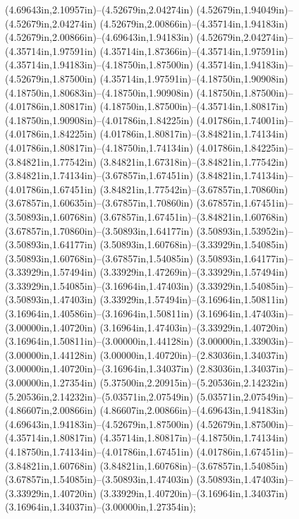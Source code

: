 (4.69643in,2.10957in)--(4.52679in,2.04274in) (4.52679in,1.94049in)--(4.52679in,2.04274in) (4.52679in,2.00866in)--(4.35714in,1.94183in) (4.52679in,2.00866in)--(4.69643in,1.94183in) (4.52679in,2.04274in)--(4.35714in,1.97591in) (4.35714in,1.87366in)--(4.35714in,1.97591in) (4.35714in,1.94183in)--(4.18750in,1.87500in) (4.35714in,1.94183in)--(4.52679in,1.87500in) (4.35714in,1.97591in)--(4.18750in,1.90908in) (4.18750in,1.80683in)--(4.18750in,1.90908in) (4.18750in,1.87500in)--(4.01786in,1.80817in) (4.18750in,1.87500in)--(4.35714in,1.80817in) (4.18750in,1.90908in)--(4.01786in,1.84225in) (4.01786in,1.74001in)--(4.01786in,1.84225in) (4.01786in,1.80817in)--(3.84821in,1.74134in) (4.01786in,1.80817in)--(4.18750in,1.74134in) (4.01786in,1.84225in)--(3.84821in,1.77542in) (3.84821in,1.67318in)--(3.84821in,1.77542in) (3.84821in,1.74134in)--(3.67857in,1.67451in) (3.84821in,1.74134in)--(4.01786in,1.67451in) (3.84821in,1.77542in)--(3.67857in,1.70860in) (3.67857in,1.60635in)--(3.67857in,1.70860in) (3.67857in,1.67451in)--(3.50893in,1.60768in) (3.67857in,1.67451in)--(3.84821in,1.60768in) (3.67857in,1.70860in)--(3.50893in,1.64177in) (3.50893in,1.53952in)--(3.50893in,1.64177in) (3.50893in,1.60768in)--(3.33929in,1.54085in) (3.50893in,1.60768in)--(3.67857in,1.54085in) (3.50893in,1.64177in)--(3.33929in,1.57494in) (3.33929in,1.47269in)--(3.33929in,1.57494in) (3.33929in,1.54085in)--(3.16964in,1.47403in) (3.33929in,1.54085in)--(3.50893in,1.47403in) (3.33929in,1.57494in)--(3.16964in,1.50811in) (3.16964in,1.40586in)--(3.16964in,1.50811in) (3.16964in,1.47403in)--(3.00000in,1.40720in) (3.16964in,1.47403in)--(3.33929in,1.40720in) (3.16964in,1.50811in)--(3.00000in,1.44128in) (3.00000in,1.33903in)--(3.00000in,1.44128in) (3.00000in,1.40720in)--(2.83036in,1.34037in) (3.00000in,1.40720in)--(3.16964in,1.34037in) (2.83036in,1.34037in)--(3.00000in,1.27354in) (5.37500in,2.20915in)--(5.20536in,2.14232in) (5.20536in,2.14232in)--(5.03571in,2.07549in) (5.03571in,2.07549in)--(4.86607in,2.00866in) (4.86607in,2.00866in)--(4.69643in,1.94183in) (4.69643in,1.94183in)--(4.52679in,1.87500in) (4.52679in,1.87500in)--(4.35714in,1.80817in) (4.35714in,1.80817in)--(4.18750in,1.74134in) (4.18750in,1.74134in)--(4.01786in,1.67451in) (4.01786in,1.67451in)--(3.84821in,1.60768in) (3.84821in,1.60768in)--(3.67857in,1.54085in) (3.67857in,1.54085in)--(3.50893in,1.47403in) (3.50893in,1.47403in)--(3.33929in,1.40720in) (3.33929in,1.40720in)--(3.16964in,1.34037in) (3.16964in,1.34037in)--(3.00000in,1.27354in);
